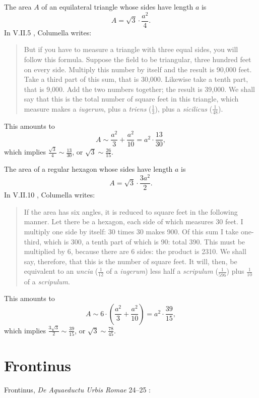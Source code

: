 \documentclass{amsart}
\theoremstyle{definition}
\begin{document}
The area $A$ of an equilateral triangle whose sides have length $a$ is
\[
A=\sqrt{3} \cdot \frac{a^2}{4}.
\]
In V.II.5 \cite[pp.~15--17]{columellaII}, Columella writes:

\begin{quote}
But if you have to measure a triangle with three equal sides, you will follow this formula. Suppose the field to be triangular, three hundred feet on every side. Multiply this number by itself and the result is 90,000 feet. Take a third part of this sum, that is
30,000. Likewise take a tenth part, that is 9,000. Add the two numbers together; the result is 39,000. We shall say that this is the total number of square feet in this triangle, which measure makes a {\em iugerum}, plus a {\em triens} ($\frac{1}{3}$), plus a {\em sicilicus} ($\frac{1}{48}$).
\end{quote}

This amounts to 
\[
A \sim \frac{a^2}{3}+\frac{a^2}{10} = a^2 \cdot \frac{13}{30},
\]
which implies $\frac{\sqrt{3}}{4} \sim \frac{13}{30}$, or $\sqrt{3} \sim \frac{26}{15}$. 

The area of a regular hexagon whose sides have length $a$ is
\[
A = \sqrt{3} \cdot \frac{3a^2}{2}.
\]
In V.II.10 \cite[pp.~21--23]{columellaII}, Columella writes:

\begin{quote}
If the area has six angles, it is reduced to square  feet in the following manner. Let there be a hexagon, each side of which measures 30 feet. I multiply one side by itself:
30 times 30 makes 900. Of this sum I take one-third, which is 300, a tenth part of which is 90: total 390. This must be multiplied
by 6, because there are 6 sides: the product is 2310. We shall say, therefore, that this is the number of square feet. It will, then, be equivalent to an {\em uncia}
($\frac{1}{12}$ of a {\em iugerum}) less half a {\em scripulum} ($\frac{1}{596}$) plus $\frac{1}{10}$ of a {\em scripulum}.
\end{quote}

This amounts to
\[
A \sim 6 \cdot \left( \frac{a^2}{3}+\frac{a^2}{10} \right) = a^2 \cdot \frac{39}{15},
\]
which implies $\frac{3\sqrt{3}}{2} \sim  \frac{39}{15}$, or $\sqrt{3} \sim \frac{78}{45}$. 






\section{Frontinus}
Frontinus, {\em De Aquaeductu Urbis Romae} 24--25 \cite{rodgers}:
\end{document}
